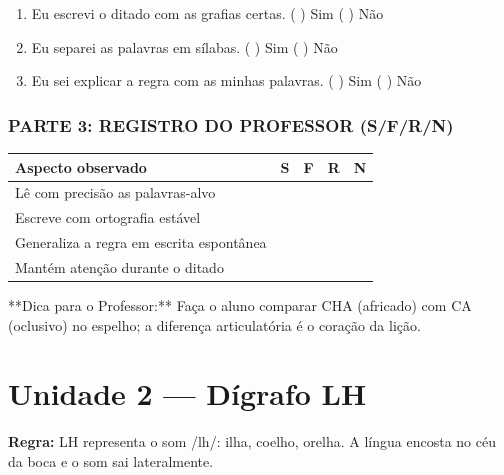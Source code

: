 \begin{exercicio}
\begin{enumerate}[label=\alph*)]
  \item Eu escrevi o ditado com as grafias certas.  \quad ( ) Sim   ( ) Não

  \item Eu separei as palavras em sílabas.  \quad ( ) Sim   ( ) Não

  \item Eu sei explicar a regra com as minhas palavras.  \quad ( ) Sim   ( ) Não

\end{enumerate}

\subsection*{PARTE 3: REGISTRO DO PROFESSOR (S/F/R/N)}

\begin{center}
\renewcommand{\arraystretch}{1.4}
\begin{tabular}{@{}p{9cm}cccc@{}}
\toprule
Aspecto observado & S & F & R & N \\
\midrule
Lê com precisão as palavras-alvo & & & & \\
Escreve com ortografia estável & & & & \\
Generaliza a regra em escrita espontânea & & & & \\
Mantém atenção durante o ditado & & & & \\
\bottomrule\end{tabular}\end{center}

\end{exercicio}

\begin{dica}
**Dica para o Professor:** Faça o aluno comparar CHA (africado) com CA (oclusivo) no espelho; a diferença articulatória é o coração da lição.
\end{dica}



\chapter{Unidade 2 --- Dígrafo LH}


\textbf{Regra:} LH representa o som /lh/: ilha, coelho, orelha. A língua encosta no céu da boca e o som sai lateralmente.

